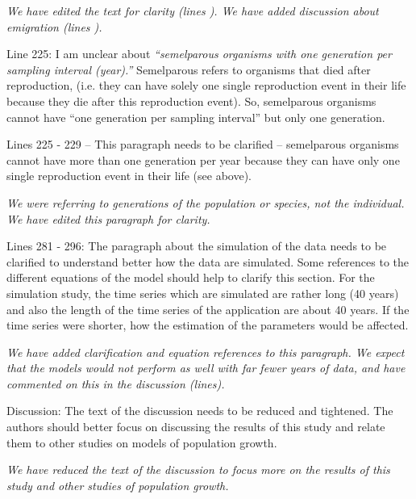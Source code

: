 \documentclass[12pt,english]{article}
\begin{document}
\begin{spacing}{1.9}
\begin{flushleft}
\vspace{0.5cm}
\textit{We have edited the text for clarity (lines ).  We have added discussion about emigration
(lines ).}
\vspace{0.5cm}

Line 225: I am unclear about \textit{``semelparous organisms with one generation per sampling
interval (year).''} Semelparous refers to organisms that died after reproduction, (i.e. they can
have solely one single reproduction event in their life because they die after this
reproduction event). So, semelparous organisms cannot have ``one generation per sampling
interval'' but only one generation.

Lines 225 - 229 – This paragraph needs to be clarified – semelparous organisms cannot have
more than one generation per year because they can have only one single reproduction
event in their life (see above).

\vspace{0.5cm}
\textit{We were referring to generations of the population or species, not the individual.  We have edited 
this paragraph for clarity.}
\vspace{0.5cm}

Lines 281 - 296: The paragraph about the simulation of the data needs to be clarified to
understand better how the data are simulated. Some references to the different equations
of the model should help to clarify this section. For the simulation study, the time series
which are simulated are rather long (40 years) and also the length of the time series of the
application are about 40 years. If the time series were shorter, how the estimation of the
parameters would be affected.

\vspace{0.5cm}
\textit{We have added clarification and equation references to this paragraph. We expect that
the models would not perform as well with far fewer years of data, and have commented on
this in the discussion (lines).}
\vspace{0.5cm}

Discussion: The text of the discussion needs to be reduced and tightened. The authors
should better focus on discussing the results of this study and relate them to other studies
on models of population growth.

\vspace{0.5cm}
\textit{We have reduced the text of the discussion to focus more on the results of this
study and other studies of population growth.}


\end{flushleft}
\end{spacing}
\end{document}
